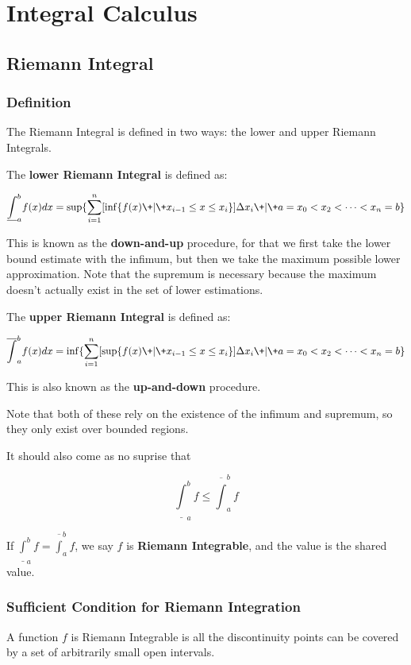 \documentclass[11 pt, twoside]{article}
\begin{document}
\section{Integral Calculus}
\subsection{Riemann Integral}

\subsubsection{Definition}
The Riemann Integral is defined in two ways: the lower and upper Riemann
Integrals.

The \textbf{lower Riemann Integral} is defined as:

$$\underline{\int}_a^b f(x) dx = \sup \{ \sum_{i=1}^n [\inf\{ f(x) \+|\+ x_{i-1} \leq x \leq
x_i\}] \Delta x_i \+|\+ a = x_0 < x_2 < \dots < x_n = b\}$$

This is known as the \textbf{down-and-up} procedure, for that we first take the
lower bound estimate with the infimum, but then we take the maximum possible
lower approximation. Note that the supremum is necessary because the maximum
doesn't actually exist in the set of lower estimations.

The \textbf{upper Riemann Integral} is defined as:

$$\overline{\int}_a^b f(x) dx = \inf \{ \sum_{i=1}^n [\sup\{ f(x) \+|\+ x_{i-1} \leq x \leq
x_i\}] \Delta x_i \+|\+ a = x_0 < x_2 < \dots < x_n = b\}$$

This is also known as the \textbf{up-and-down} procedure.

Note that both of these rely on the existence of the infimum and supremum, so
they only exist over bounded regions.

It should also come as no suprise that

$$\underline{\int}_a^b f \leq \overline{\int}_a^b f$$

If $\underline{\int}_a^b f = \overline{\int}_a^b f$, we say $f$ is \textbf{Riemann
Integrable}, and the value is the shared value.

\subsubsection{Sufficient Condition for Riemann Integration}
A function $f$ is Riemann Integrable is all the discontinuity points can be
covered by a set of arbitrarily small open intervals.
\end{document}
